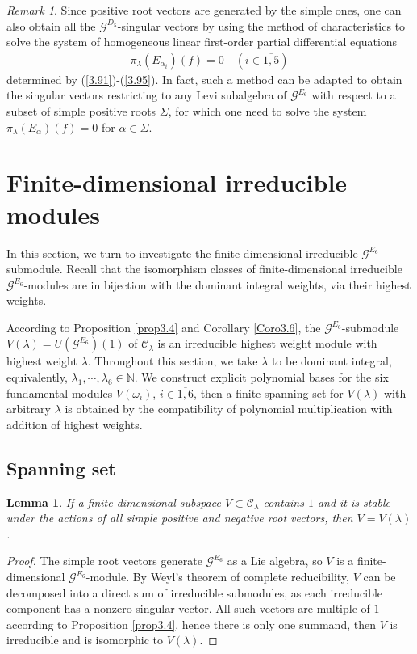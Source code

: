 \documentclass[12pt]{article}
\numberwithin{equation}{section}
\newtheorem{lemma}[theorem]{Lemma}
\theoremstyle{definition}
\theoremstyle{remark}
\newtheorem{remark}[theorem]{Remark}
\begin{document}
\begin{remark}
	Since positive root vectors are generated by the simple ones,
	one can also obtain all the $\mathscr{G}^{D_5}$-singular vectors by using the method of characteristics to solve the system of homogeneous linear first-order partial differential equations
	\begin{eqnarray}
		\pi_{\lambda}(E_{\alpha_i})(f)=0\quad (i\in\overline{1,5})
	\end{eqnarray}
	determined by (\ref{3.91})-(\ref{3.95}).
	In fact, such a method can be adapted to obtain the singular vectors restricting to any Levi subalgebra of $\mathscr{G}^{E_{6}}$ with respect to a subset of simple positive roots $\Sigma$, for which one need to solve the system $\pi_{\lambda}(E_{\alpha})(f)=0$ for $\alpha\in\Sigma$.
\end{remark}


\section{Finite-dimensional irreducible modules}\label{section4}

In this section, we turn to investigate the finite-dimensional irreducible $\mathscr{G}^{E_6}$-submodule. Recall that the isomorphism classes of finite-dimensional irreducible $\mathscr{G}^{E_6}$-modules are in bijection with the dominant integral weights, via their highest weights. 

According to Proposition \ref{prop3.4} and Corollary \ref{Coro3.6}, the $\mathscr{G}^{E_6}$-submodule $V(\lambda)=U(\mathscr{G}^{E_6})(1)$ of $\mathscr{C}_{\lambda}$ is an irreducible highest weight module with highest weight $\lambda$. Throughout this section, we take $\lambda$ to be dominant integral, equivalently, $\lambda_1,\cdots,\lambda_6\in\mathbb{N}$. We construct explicit polynomial bases for the six fundamental modules $V(\omega_i)$, $i\in\overline{1,6}$, then a finite spanning set for $V(\lambda)$ with arbitrary $\lambda$ is obtained by the compatibility of polynomial multiplication with addition of highest weights.


\subsection{Spanning set}

\begin{lemma}\label{lem4.1}
	If a finite-dimensional subspace $V\subset\mathscr{C}_{\lambda}$ contains $1$ and it is stable under the actions of all simple positive and negative root vectors, then $V=V(\lambda)$.
\end{lemma}
\begin{proof}
	The simple root vectors generate $\mathscr{G}^{E_6}$ as a Lie algebra, so $V$ is a finite-dimensional $\mathscr{G}^{E_6}$-module. By Weyl's theorem of complete reducibility, $V$ can be decomposed into a direct sum of irreducible submodules, as each irreducible component has a nonzero singular vector. All such vectors are multiple of $1$ according to Proposition \ref{prop3.4}, hence there is only one summand, then $V$ is irreducible and is isomorphic to $V(\lambda)$.
\end{proof}
\end{document}
